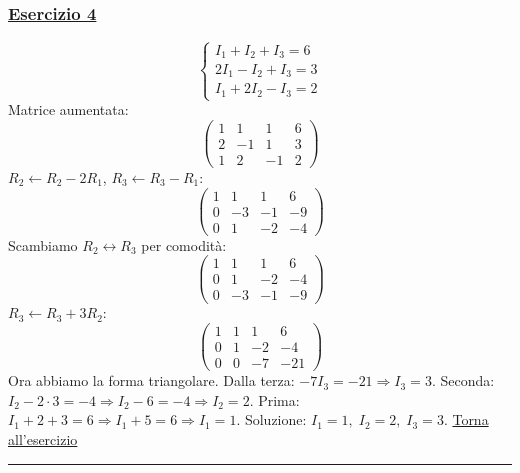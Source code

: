 \subsubsection*{\hyperref[ex:4]{Esercizio 4}}
\[
\begin{cases}
I_1 + I_2 + I_3 = 6 \\
2I_1 - I_2 + I_3 = 3 \\
I_1 + 2I_2 - I_3 = 2
\end{cases}
\]
Matrice aumentata:
\[
\left(\begin{array}{ccc|c}
1 & 1 & 1 & 6 \\
2 & -1 & 1 & 3 \\
1 & 2 & -1 & 2
\end{array}\right)
\]
\(R_2 \leftarrow R_2 - 2R_1\), \(R_3 \leftarrow R_3 - R_1\):
\[
\left(\begin{array}{ccc|c}
1 & 1 & 1 & 6 \\
0 & -3 & -1 & -9 \\
0 & 1 & -2 & -4
\end{array}\right)
\]
Scambiamo \(R_2 \leftrightarrow R_3\) per comodità:
\[
\left(\begin{array}{ccc|c}
1 & 1 & 1 & 6 \\
0 & 1 & -2 & -4 \\
0 & -3 & -1 & -9
\end{array}\right)
\]
\(R_3 \leftarrow R_3 + 3R_2\):
\[
\left(\begin{array}{ccc|c}
1 & 1 & 1 & 6 \\
0 & 1 & -2 & -4 \\
0 & 0 & -7 & -21
\end{array}\right)
\]
Ora abbiamo la forma triangolare. Dalla terza: \(-7I_3 = -21 \Rightarrow I_3 = 3\).
Seconda: \(I_2 - 2\cdot3 = -4 \Rightarrow I_2 -6 = -4 \Rightarrow I_2 = 2\).
Prima: \(I_1 + 2 + 3 = 6 \Rightarrow I_1 +5 = 6 \Rightarrow I_1 = 1\).
Soluzione: \(I_1 = 1,\; I_2 = 2,\; I_3 = 3\). \hfill \hyperlink{ex:4}{Torna all'esercizio}\\
\hrule

